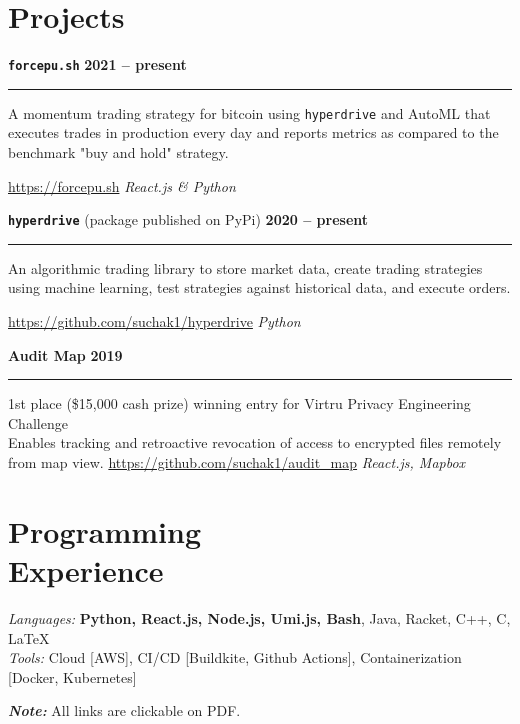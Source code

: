 \documentclass[margin]{resume}
\begin{document}
    \section{\mysidestyle Projects}

\texttt{\textbf{force}\textcolor{blu}{\textbf{pu.sh}}} \hfill \textbf{2021 -- present}
\hrule
A momentum trading strategy for bitcoin using \texttt{hyperdrive} and AutoML that executes trades in production every day and reports metrics as compared to the benchmark "buy and hold" strategy.

\url{https://forcepu.sh} \hfill \textit{React.js \& Python}


\texttt{\textbf{hyperdrive}} (package published on PyPi) \hfill \textbf{2020 -- present}
\hrule
An algorithmic trading library to store market data, create trading strategies using machine learning, test strategies against historical data, and execute orders.

\url{https://github.com/suchak1/hyperdrive} \hfill \textit{Python}

\textcolor{blu}{\textbf{Audit Map}} \hfill \textbf{2019}
\hrule
1st place (\$15,000 cash prize) winning entry for Virtru Privacy Engineering Challenge \\ 
Enables tracking and retroactive revocation of access to encrypted files remotely from map view.
\url{https://github.com/suchak1/audit_map} \hfill \textit{React.js, Mapbox}
        \section{\mysidestyle Programming\\Experience}

    \emph{Languages:} \textbf{Python, React.js, Node.js, Umi.js, Bash}, Java, Racket, C++, C, \LaTeX \\
    \emph{Tools:} Cloud [AWS], CI/CD [Buildkite, Github Actions], Containerization [Docker, Kubernetes]
    
\textbf {\textit {Note:}} All links are clickable on PDF.
    
\end{document}
